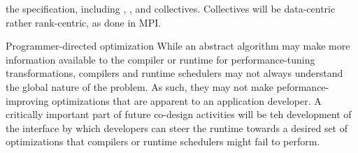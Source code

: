 \begin{compactdesc}
  the specification, including ,
  , and  collectives.
Collectives will be data-centric rather rank-centric, as done in MPI.
\item {Programmer-directed optimization}
While an abstract algorithm may make more information available to the compiler or runtime for performance-tuning transformations,
compilers and runtime schedulers may not always understand the global nature of the problem.
As such, they may not make peformance-improving optimizations that are apparent to an application developer.
A critically important part of future co-design activities will be teh
development of the interface by which developers can steer the runtime towards
a desired set of optimizations that compilers or runtime schedulers might fail
to perform.
\end{compactdesc}






 

